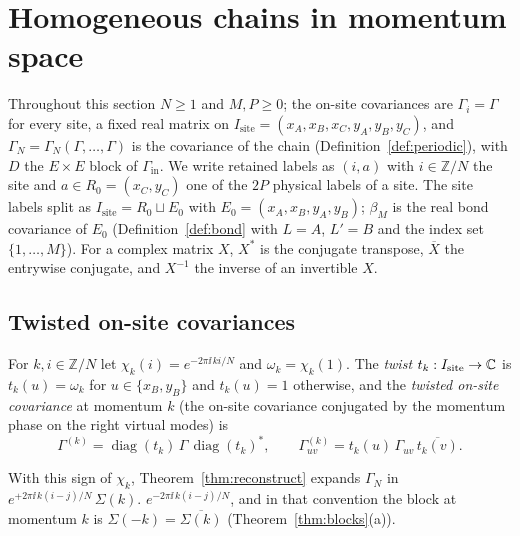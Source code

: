 \section{Homogeneous chains in momentum space}
\label{sec:fourier}

Throughout this section $N\geq1$ and $M,P\geq0$; the on-site covariances are
$\Gamma_i=\Gamma$ for every site, a fixed real matrix on $I_{\mathrm{site}}=(x_A,x_B,x_C,y_A,y_B,y_C)$, and
$\Gamma_N=\Gamma_N(\Gamma,\ldots,\Gamma)$ is the covariance of the chain
(Definition~\ref{def:periodic}), with $D$ the $E\times E$ block of $\Gamma_{\mathrm{in}}$.
We write retained labels as $(i,a)$ with $i\in\mathbb Z/N$ the site and
$a\in R_0=(x_C,y_C)$ one of the $2P$ physical labels of a site. The site labels split as
$I_{\mathrm{site}}=R_0\sqcup E_0$ with $E_0=(x_A,x_B,y_A,y_B)$; $\beta_M$ is the real bond covariance of
$E_0$ (Definition~\ref{def:bond} with $L=A$, $L'=B$ and the index set $\{1,\ldots,M\}$).
For a complex matrix $X$, $X^*$ is the conjugate transpose, $\overline X$ the entrywise
conjugate, and $X^{-1}$ the inverse of an invertible $X$.

\subsection{Twisted on-site covariances}
\begin{definition}\label{def:twist}
For $k,i\in\mathbb Z/N$ let $\chi_k(i)=e^{-2\pi\ii\,ki/N}$ and $\omega_k=\chi_k(1)$.
The \emph{twist} $t_k:I_{\mathrm{site}}\to\mathbb C$ is $t_k(u)=\omega_k$ for $u\in\{x_B,y_B\}$ and
$t_k(u)=1$ otherwise, and the \emph{twisted on-site covariance} at momentum $k$ (the on-site covariance conjugated by
the momentum phase on the right virtual modes) is
\[
 \Gamma^{(k)}=\operatorname{diag}(t_k)\,\Gamma\,\operatorname{diag}(t_k)^*,\qquad
 \Gamma^{(k)}_{uv}=t_k(u)\,\Gamma_{uv}\,\overline{t_k(v)} .
\]
\end{definition}
With this sign of $\chi_k$, Theorem~\ref{thm:reconstruct} expands $\Gamma_N$ in
$e^{+2\pi\ii\,k(i-j)/N}\,\Sigma(k)$.  $e^{-2\pi\ii\,k(i-j)/N}$, and
in that convention the block at momentum $k$ is $\Sigma(-k)=\overline{\Sigma(k)}$
(Theorem~\ref{thm:blocks}(a)).


